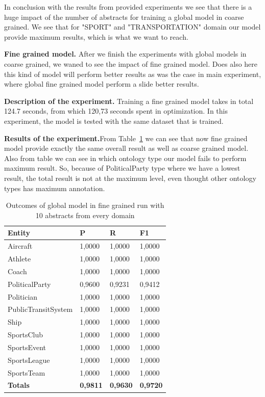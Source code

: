 \documentclass[thesis=M,english]{FITthesis}[2018/05/30]
\begin{document}
	In conclusion with the results from provided experiments we see that there is a huge impact of the number of abstracts for training a global model in coarse grained. We see that for "SPORT" and "TRANSPORTATION" domain our model provide maximum results, which is what we want to reach.


	\textbf{Fine grained model.} After we finish the experiments with global models in coarse grained, we waned to see the impact of fine grained model. Does also here this kind of model will perform better results as was the case in main experiment, where global fine grained model perform a slide better results.
	
	\textbf{Description of the experiment.} Training a fine grained model takes in total 124.7 seconds, from which 120,73 seconds spent in optimization. In this experiment, the model is tested with the same dataset that is trained.
	
	\textbf{Results of the experiment.}From Table~\ref{table:GlobalDomainWithAllAbstractsTop10Fine} we can see that now fine grained model provide exactly the same overall result as well as coarse grained model. Also from table we can see in which ontology type our model fails to perform maximum result. So, because of PoliticalParty type where we have a lowest result, the total result is not at the maximum level, even thought other ontology types has maximum annotation.
	  	
	\begin{table}[H]\centering
		\begin{tabular}{|l|l|l|l|}
			\hline {\textbf{Entity}} & {\textbf{P}} & {\textbf{R}} & {\textbf{F1}}\\\hline
				Aircraft & 1,0000 & 1,0000 & 1,0000\\
				Athlete & 1,0000 & 1,0000 & 1,0000\\
				Coach & 1,0000 & 1,0000 & 1,0000\\
				PoliticalParty & 0,9600 & 0,9231 & 0,9412\\
				Politician & 1,0000 & 1,0000 & 1,0000\\
				PublicTransitSystem & 1,0000 & 1,0000 & 1,0000\\
				Ship & 1,0000 & 1,0000 & 1,0000\\
				SportsClub & 1,0000 & 1,0000 & 1,0000\\
				SportsEvent & 1,0000 & 1,0000 & 1,0000\\
				SportsLeague & 1,0000 & 1,0000 & 1,0000\\
				SportsTeam & 1,0000 & 1,0000 & 1,0000\\\hline
				\textbf{Totals} & \textbf{0,9811} & \textbf{0,9630} & \textbf{0,9720}\\\hline
		\end{tabular}
		\caption{Outcomes of global model in fine grained run with 10 abstracts from every domain \label{table:GlobalDomainWithAllAbstractsTop10Fine}}	
	\end{table}
\end{document}
